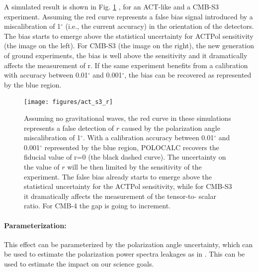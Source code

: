 A simulated result is shown in Fig. \ref{plot_r:fig} \cite{nati_2017}, for an
ACT-like and a CMB-S3 experiment. Assuming  the red curve represents a false
bias signal introduced by a miscalibration of 1$^{\circ}$ (i.e., the current
accuracy) in the orientation of the detectors.  The bias starts to emerge above
the statistical uncertainty for ACTPol sensitivity (the image on the left). For
CMB-S3 (the image on the right), the new generation of ground experiments, the
bias is well above the sensitivity and it dramatically affects the measurement
of r. If the same experiment benefits from a calibration with accuracy between
0.01$^{\circ}$ and 0.001$^{\circ}$, the bias can be recovered as represented by
the blue region.
 
\begin{figure}[ht]
\begin{center}
\texttt{[image: figures/act\_s3\_r]} 
\end{center}
\caption{Assuming no gravitational waves, the red curve in these simulations
represents a false detection of $r$ caused by the polarization angle
miscalibration of 1$^{\circ}$. With a calibration accuracy between
0.01$^{\circ}$ and 0.001$^{\circ}$ represented by the blue region, POLOCALC
\cite{nati_2017} recovers the fiducial value of r=0 (the black dashed curve).
The uncertainty on the value of $r$ will be then limited by the sensitivity of
the experiment. The false bias already starts to emerge above the statistical
uncertainty for the ACTPol sensitivity, while for CMB-S3 it dramatically
affects the measurement of the tensor-to- scalar ratio. For CMB-4 the gap is
going to increment.}
\label{plot_r:fig}
\end{figure}

\paragraph{Parameterization:}
This effect can be parameterized by the polarization angle uncertainty, which
can be used to estimate the polarization power spectra leakages as in
\cite{nati_2017}. This can be used to estimate the impact on our
science goals.
